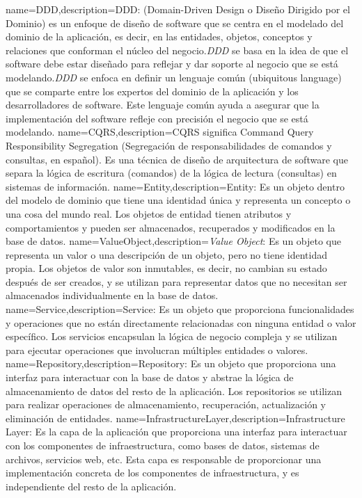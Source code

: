  {name={DDD},description={DDD: (Domain-Driven Design o Diseño Dirigido por el Dominio) es un enfoque de diseño de software que se centra en el modelado del dominio de la aplicación, es decir, en las entidades, objetos, conceptos y relaciones que conforman el núcleo del negocio.\textit{DDD} se basa en la idea de que el software debe estar diseñado para reflejar y dar soporte al negocio que se está modelando.\textit{DDD} se enfoca en definir un lenguaje común (ubiquitous language) que se comparte entre los expertos del dominio de la aplicación y los desarrolladores de software. Este lenguaje común ayuda a asegurar que la implementación del software refleje con precisión el negocio que se está modelando.}}
 {name={CQRS},description={CQRS significa Command Query Responsibility Segregation (Segregación de responsabilidades de comandos y consultas, en español). Es una técnica de diseño de arquitectura de software que separa la lógica de escritura (comandos) de la lógica de lectura (consultas) en sistemas de información.}}
 {name={Entity},description={Entity: Es un objeto dentro del modelo de dominio que tiene una identidad única y representa un concepto o una cosa del mundo real. Los objetos de entidad tienen atributos y comportamientos y pueden ser almacenados, recuperados y modificados en la base de datos.}}
 {name={ValueObject},description={\textit{Value Object}: Es un objeto que representa un valor o una descripción de un objeto, pero no tiene identidad propia. Los objetos de valor son inmutables, es decir, no cambian su estado después de ser creados, y se utilizan para representar datos que no necesitan ser almacenados individualmente en la base de datos.}}
 {name={Service},description={Service: Es un objeto que proporciona funcionalidades y operaciones que no están directamente relacionadas con ninguna entidad o valor específico. Los servicios encapsulan la lógica de negocio compleja y se utilizan para ejecutar operaciones que involucran múltiples entidades o valores.}}
 {name={Repository},description={Repository: Es un objeto que proporciona una interfaz para interactuar con la base de datos y abstrae la lógica de almacenamiento de datos del resto de la aplicación. Los repositorios se utilizan para realizar operaciones de almacenamiento, recuperación, actualización y eliminación de entidades.}}
 {name={InfrastructureLayer},description={Infrastructure Layer: Es la capa de la aplicación que proporciona una interfaz para interactuar con los componentes de infraestructura, como bases de datos, sistemas de archivos, servicios web, etc. Esta capa es responsable de proporcionar una implementación concreta de los componentes de infraestructura, y es independiente del resto de la aplicación.}}
